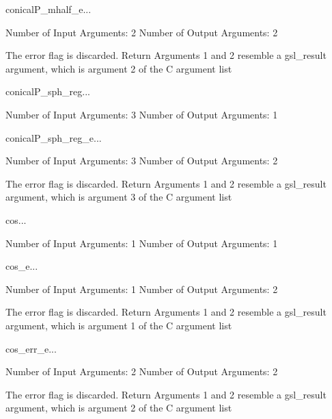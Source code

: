 \begin{funcdesc}{conicalP_mhalf_e}{...}

    Number of Input  Arguments:  2
    Number of Output Arguments:  2

The error flag is discarded.
Return Arguments 1 and 2 resemble a gsl_result argument,
	which is  argument 2 of the C argument list

\end{funcdesc}

\begin{funcdesc}{conicalP_sph_reg}{...}

    Number of Input  Arguments:  3
    Number of Output Arguments:  1
\end{funcdesc}

\begin{funcdesc}{conicalP_sph_reg_e}{...}

    Number of Input  Arguments:  3
    Number of Output Arguments:  2

The error flag is discarded.
Return Arguments 1 and 2 resemble a gsl_result argument,
	which is  argument 3 of the C argument list

\end{funcdesc}

\begin{funcdesc}{cos}{...}

    Number of Input  Arguments:  1
    Number of Output Arguments:  1
\end{funcdesc}

\begin{funcdesc}{cos_e}{...}

    Number of Input  Arguments:  1
    Number of Output Arguments:  2

The error flag is discarded.
Return Arguments 1 and 2 resemble a gsl_result argument,
	which is  argument 1 of the C argument list

\end{funcdesc}

\begin{funcdesc}{cos_err_e}{...}

    Number of Input  Arguments:  2
    Number of Output Arguments:  2

The error flag is discarded.
Return Arguments 1 and 2 resemble a gsl_result argument,
	which is  argument 2 of the C argument list

\end{funcdesc}

